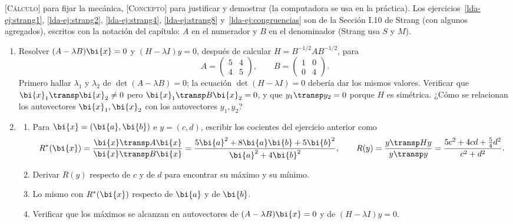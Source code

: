 \noindent\footnotesize \textsc{[Cálculo]} para fijar la mecánica,
\textsc{[Concepto]} para justificar y demostrar (la computadora se usa en la
práctica). Los ejercicios~\ref{lda-ej:strang1}, \ref{lda-ej:strang2},
\ref{lda-ej:strang4}, \ref{lda-ej:strang8} y~\ref{lda-ej:congruencias} son de
la Sección I.10 de Strang (con algunos
agregados), escritos con la notación del capítulo: $A$ en el numerador y $B$ en
el denominador (Strang usa $S$ y $M$).\normalsize

\begin{enumerate}[leftmargin=*,label=\textbf{\thechapter.\arabic*},ref=\thechapter.\arabic*,itemsep=4pt]

\item {}\label{lda-ej:strang1} Resolver $(A-\lambda B)\bi{x}=0$ y
$(H-\lambda I)y=0$, después de calcular $H=B^{-1/2}AB^{-1/2}$, para
\[
A=\begin{pmatrix}5&4\\4&5\end{pmatrix},\qquad B=\begin{pmatrix}1&0\\0&4\end{pmatrix}.
\]
Primero hallar $\lambda_1$ y $\lambda_2$ de $\det(A-\lambda B)=0$; la ecuación
$\det(H-\lambda I)=0$ debería dar los mismos valores. Verificar que
$\bi{x}_1\transp \bi{x}_2\ne0$ pero $\bi{x}_1\transp B\bi{x}_2=0$, y que $y_1\transp y_2=0$ porque
$H$ es simétrica. ¿Cómo se relacionan los autovectores $\bi{x}_1,\bi{x}_2$ con los
autovectores $y_1,y_2$?

\item {}\label{lda-ej:strang2}
\begin{enumerate}[label=(\alph*)]
\item Para $\bi{x}=(\bi{a},\bi{b})$ e $y=(c,d)$, escribir los cocientes del ejercicio
anterior como
\[
R^\ast(\bi{x})=\frac{\bi{x}\transp A\bi{x}}{\bi{x}\transp B\bi{x}}=\frac{5\bi{a}^2+8\bi{a}\bi{b}+5\bi{b}^2}{\bi{a}^2+4\bi{b}^2},\qquad
R(y)=\frac{y\transp Hy}{y\transp y}=\frac{5c^2+4cd+\frac54d^2}{c^2+d^2}.
\]
\item Derivar $R(y)$ respecto de $c$ y de $d$ para encontrar su máximo y su
mínimo.
\item Lo mismo con $R^\ast(\bi{x})$ respecto de $\bi{a}$ y de $\bi{b}$.
\item Verificar que los máximos se alcanzan en autovectores de
$(A-\lambda B)\bi{x}=0$ y de $(H-\lambda I)y=0$.
\end{enumerate}


\end{enumerate}
